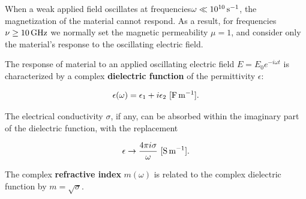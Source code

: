 \documentclass[a4paper,10pt]{article}
\begin{document}
{\noindent}When a weak applied field oscillates at frequencies$\omega\ll10^{10}\,{\rm s^{-1}}$, the magnetization of the material cannot respond. As a result, for frequencies $\nu\geq10\,{\rm GHz}$ we normally set the magnetic permeability $\mu=1$, and consider only the material's response to the oscillating electric field.

{\noindent}The response of material to an applied oscillating electric field $E=E_0e^{-i\omega t}$ is characterized by a complex \textbf{dielectric function} of the permittivity $\epsilon$:

\begin{align*}
    \epsilon(\omega) = \epsilon_1 + i\epsilon_2 ~ [{\rm F\,m^{-1}}].
\end{align*}

{\noindent}The electrical conductivity $\sigma$, if any, can be absorbed within the imaginary part of the dielectric function, with the replacement

\begin{align*}
    \epsilon \rightarrow \frac{4\pi i\sigma}{\omega} ~ [{\rm S\,m^{-1}}].
\end{align*}

{\noindent}The complex \textbf{refractive index} $m(\omega)$ is related to the complex dielectric function by $m=\sqrt{\sigma}$.
\end{document}
